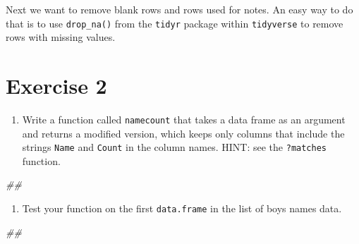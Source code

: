 \documentclass[]{book}
\newenvironment{Shaded}{\begin{snugshade}}{\end{snugshade}}
\newcommand{\CommentTok}[1]{\textcolor[rgb]{0.56,0.35,0.01}{\textit{#1}}}
\newcommand{\DecValTok}[1]{\textcolor[rgb]{0.00,0.00,0.81}{#1}}
\newcommand{\KeywordTok}[1]{\textcolor[rgb]{0.13,0.29,0.53}{\textbf{#1}}}
\newcommand{\NormalTok}[1]{#1}
\newcommand{\OperatorTok}[1]{\textcolor[rgb]{0.81,0.36,0.00}{\textbf{#1}}}
\newcommand{\StringTok}[1]{\textcolor[rgb]{0.31,0.60,0.02}{#1}}
\providecommand{\tightlist}{%
  \setlength{\itemsep}{0pt}\setlength{\parskip}{0pt}}
\begin{document}
Next we want to remove blank rows and rows used for notes. An easy way
to do that is to use \texttt{drop\_na()} from the \texttt{tidyr} package within \texttt{tidyverse}
to remove rows with missing values.

\begin{Shaded}
\end{Shaded}

\hypertarget{exercise-2-2}{%
\section{Exercise 2}\label{exercise-2-2}}

\begin{enumerate}
\def\labelenumi{\arabic{enumi}.}
\tightlist
\item
  Write a function called \texttt{namecount} that takes a data frame as an
  argument and returns a modified version, which keeps only columns that
  include the strings \texttt{Name} and \texttt{Count} in the column names.
  HINT: see the \texttt{?matches} function.
\end{enumerate}

\begin{Shaded}
\begin{Highlighting}[]
\CommentTok{## }
\end{Highlighting}
\end{Shaded}

\begin{enumerate}
\def\labelenumi{\arabic{enumi}.}
\setcounter{enumi}{1}
\tightlist
\item
  Test your function on the first \texttt{data.frame} in the list of boys
  names data.
\end{enumerate}

\begin{Shaded}
\begin{Highlighting}[]
\CommentTok{## }
\end{Highlighting}
\end{Shaded}
\end{document}
